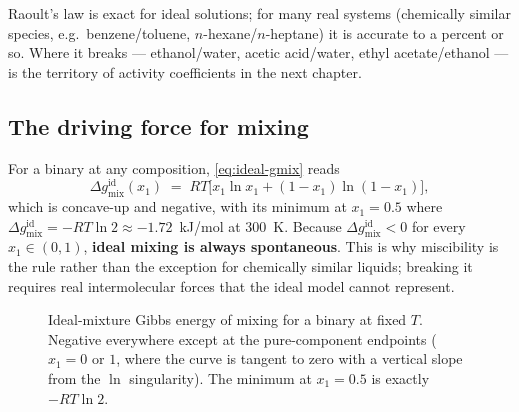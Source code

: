 \documentclass[11pt,a4paper]{article}
\begin{document}
Raoult's law is exact for ideal solutions; for many real systems
(chemically similar species, e.g.\ benzene/toluene, $n$-hexane/$n$-heptane)
it is accurate to a percent or so.  Where it breaks ---
ethanol/water, acetic acid/water, ethyl acetate/ethanol --- is the
territory of activity coefficients in the next chapter.

\subsection{The driving force for mixing}

For a binary at any composition, \eqref{eq:ideal-gmix} reads
\begin{equation}
   \Delta g_{\mathrm{mix}}^{\mathrm{id}}(x_1)
   \;=\; RT\bigl[x_1 \ln x_1 + (1 - x_1) \ln (1 - x_1)\bigr],
\end{equation}
which is concave-up and negative, with its minimum at
$x_1 = 0.5$ where $\Delta g_{\mathrm{mix}}^{\mathrm{id}} =
-RT \ln 2 \approx -1.72$~kJ/mol at 300~K.  Because
$\Delta g_{\mathrm{mix}}^{\mathrm{id}} < 0$ for every $x_1 \in (0,1)$,
\textbf{ideal mixing is always spontaneous}.  This is why miscibility
is the rule rather than the exception for chemically similar liquids;
breaking it requires real intermolecular forces that the ideal model
cannot represent.

\begin{figure}[h]
\centering
{}
\caption{Ideal-mixture Gibbs energy of mixing for a binary at fixed
$T$.  Negative everywhere except at the pure-component endpoints
($x_1 = 0$ or $1$, where the curve is tangent to zero with a vertical
slope from the $\ln$ singularity).  The minimum at $x_1 = 0.5$ is
exactly $-RT \ln 2$.}
\label{fig:ideal-gmix}
\end{figure}
\end{document}
